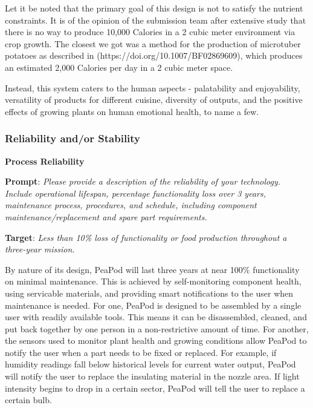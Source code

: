 \documentclass{report}
\begin{document}
Let it be noted that the primary goal of this design is not to satisfy the nutrient constraints. It is of the opinion of the submission team after extensive study that there is no way to produce 10,000 Calories in a 2 cubic meter environment via crop growth. The closest we got was a method for the production of microtuber potatoes as described in (https://doi.org/10.1007/BF02869609), which produces an estimated 2,000 Calories per day in a 2 cubic meter space.

Instead, this system caters to the human aspects - palatability and enjoyability, versatility of products for different cuisine, diversity of outputs, and the positive effects of growing plants on human emotional health, to name a few.


\newpage

\subsubsection{Reliability and/or Stability}

\textbf{Process Reliability}
\label{sec:reliability-process}

\textbf{Prompt}: \textit{Please provide a description of the reliability of your technology. Include operational lifespan, percentage functionality loss over 3 years, maintenance process, procedures, and schedule, including component maintenance/replacement and spare part requirements.}

\textbf{Target}: \textit{Less than 10\% loss of functionality or food production throughout a three-year mission.}


By nature of its design, PeaPod will last three years at near 100\% functionality on minimal maintenance.
This is achieved by self-monitoring component health, using servicable materials, and providing smart notifications to the user when maintenance is needed.
For one, PeaPod is designed to be assembled by a single user with readily available tools. This means it can be disassembled, cleaned, and put back together by one person in a non-restrictive amount of time.
For another, the sensors used to monitor plant health and growing conditions allow PeaPod to notify the user when a part needs to be fixed or replaced. For example, if humidity readings fall below historical levels for current water output, PeaPod will notify the user to replace the insulating material in the nozzle area. If light intensity begins to drop in a certain sector, PeaPod will tell the user to replace a certain bulb.
\end{document}
